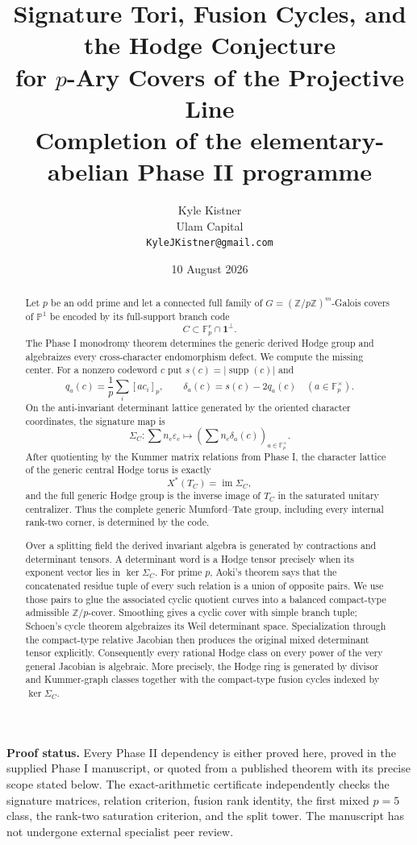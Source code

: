\documentclass[11pt]{article}
\title{\vspace{-1.35em}\textbf{Signature Tori, Fusion Cycles, and the Hodge Conjecture\vspace{0.08em}\\for $p$-Ary Covers of the Projective Line}\vspace{0.15em}\\
\large Completion of the elementary-abelian Phase II programme}
\author{Kyle Kistner\\\small Ulam Capital\\\small \texttt{KyleJKistner@gmail.com}}
\date{10 August 2026}
\theoremstyle{definition}
\theoremstyle{remark}
\newcommand{\Z}{\mathbb Z}
\newcommand{\F}{\mathbb F}
\newcommand{\PP}{\mathbb P}
\newcommand{\supp}{\operatorname{supp}}
\newcommand{\one}{\mathbf 1}
\newcommand{\eps}{\varepsilon}
\begin{document}
\maketitle
\vspace{-1.0em}

\begin{abstract}
Let $p$ be an odd prime and let a connected full family of $G=(\Z/p\Z)^m$-Galois covers of $\PP^1$ be encoded by its full-support branch code
\[
 C\subset \F_p^r\cap\one^\perp.
\]
The Phase I monodromy theorem determines the generic derived Hodge group and algebraizes every cross-character endomorphism defect.  We compute the missing center.  For a nonzero codeword $c$ put $s(c)=|\supp(c)|$ and
\[
 q_a(c)=\frac1p\sum_i[ac_i]_p,
 \qquad
 \delta_a(c)=s(c)-2q_a(c)
 \quad(a\in\F_p^\times).
\]
On the anti-invariant determinant lattice generated by the oriented character coordinates, the signature map is
\[
 \Sigma_C:\sum n_c\eps_c\longmapsto
 \left(\sum n_c\delta_a(c)\right)_{a\in\F_p^\times}.
\]
After quotienting by the Kummer matrix relations from Phase I, the character lattice of the generic central Hodge torus is exactly
\[
 X^*(T_C)=\operatorname{im}\Sigma_C,
\]
and the full generic Hodge group is the inverse image of $T_C$ in the saturated unitary centralizer.  Thus the complete generic Mumford--Tate group, including every internal rank-two corner, is determined by the code.

Over a splitting field the derived invariant algebra is generated by contractions and determinant tensors.  A determinant word is a Hodge tensor precisely when its exponent vector lies in $\ker\Sigma_C$.  For prime $p$, Aoki's theorem says that the concatenated residue tuple of every such relation is a union of opposite pairs.  We use those pairs to glue the associated cyclic quotient curves into a balanced compact-type admissible $\Z/p$-cover.  Smoothing gives a cyclic cover with simple branch tuple; Schoen's cycle theorem algebraizes its Weil determinant space.  Specialization through the compact-type relative Jacobian then produces the original mixed determinant tensor explicitly.  Consequently every rational Hodge class on every power of the very general Jacobian is algebraic.  More precisely, the Hodge ring is generated by divisor and Kummer-graph classes together with the compact-type fusion cycles indexed by $\ker\Sigma_C$.
\end{abstract}

\noindent\textbf{Proof status.}
Every Phase II dependency is either proved here, proved in the supplied Phase I manuscript, or quoted from a published theorem with its precise scope stated below.  The exact-arithmetic certificate independently checks the signature matrices, relation criterion, fusion rank identity, the first mixed $p=5$ class, the rank-two saturation criterion, and the split tower.  The manuscript has not undergone external specialist peer review.
\end{document}
